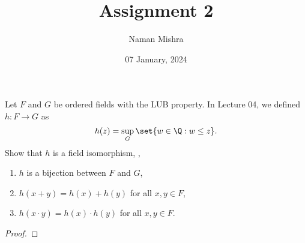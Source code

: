 \documentclass[12pt]{article}
\title{Assignment 2}
\author{Naman Mishra}
\date{07 January, 2024}
\begin{document}
\maketitle
\begin{problem}
    Let $F$ and $G$ be ordered fields with the LUB property.
    In Lecture 04, we defined $h\colon F \to G$ as \[
        h(z) = \sup_G\set{w \in \Q : w \le z}.
    \] Show that $h$ is a field isomorphism, \ie,
    \begin{enumerate}[label=(\arabic*)]
        \item $h$ is a bijection between $F$ and $G$,
        \item $h(x + y) = h(x) + h(y)$ for all $x, y \in F$,
        \item $h(x \cdot y) = h(x) \cdot h(y)$ for all $x, y \in F$.
    \end{enumerate}
\end{problem}
\begin{proof}
\end{proof}
\end{document}
